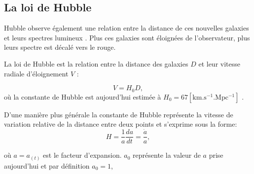 \subsection{La loi de Hubble}
Hubble observe également une relation entre la distance de ces nouvelles galaxies et leurs spectres lumineux \citep{1929CoMtW...3...23H}.
Plus ces galaxies sont éloignées de l'observateur, plus leurs spectre est décalé vers le rouge.
%

La loi de Hubble est la relation entre la distance des galaxies $D$ et leur vitesse radiale d'éloignement $V$ : %

\begin{equation}
V = H_0 D,
\end{equation}
où la constante de Hubble est aujourd'hui estimée à $H_0 = 67 \mathrm{ \left[ km.s^{-1}.Mpc^{-1} \right ] }$ \citep{planck_collaboration_planck_2016}.

D'une manière plus générale la constante de Hubble représente la vitesse de variation relative de la distance entre deux points et s'exprime sous la forme:
\begin{equation}
H=\frac{1}{a} \frac{da}{dt} = \frac{\dot{a}}{a},
\end{equation}

où $a = a_{(t)}$ est le facteur d'expansion.
$a_0$ représente la valeur de $a$ prise aujourd'hui et par définition $a_0=1$,

